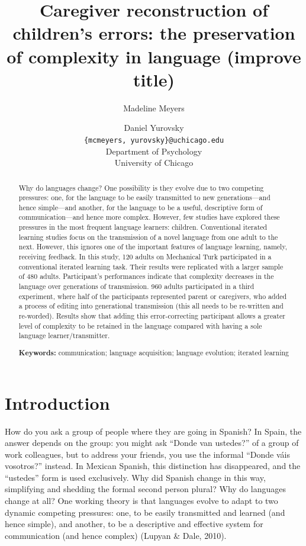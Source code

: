 \documentclass[10pt, letterpaper]{article}
\title{Caregiver reconstruction of children's errors: the preservation of
complexity in language (improve title)}
\author{Madeline Meyers \and Daniel Yurovsky \\
        \texttt{\{mcmeyers, yurovsky\}@uchicago.edu} \\
       Department of Psychology \\ University of Chicago}
\begin{document}
\maketitle

\begin{abstract}
Why do languages change? One possibility is they evolve due to two
competing pressures: one, for the language to be easily transmitted to
new generations---and hence simple---and another, for the language to be
a useful, descriptive form of communication---and hence more complex.
However, few studies have explored these pressures in the most frequent
language learners: children. Conventional iterated learning studies
focus on the transmission of a novel language from one adult to the
next. However, this ignores one of the important features of language
learning, namely, receiving feedback. In this study, 120 adults on
Mechanical Turk participated in a conventional iterated learning task.
Their results were replicated with a larger sample of 480 adults.
Participant's performances indicate that complexity decreases in the
language over generations of transmission. 960 adults participated in a
third experiment, where half of the participants represented parent or
caregivers, who added a process of editing into generational
transmission (this all needs to be re-written and re-worded). Results
show that adding this error-correcting participant allows a greater
level of complexity to be retained in the language compared with having
a sole language learner/transmitter.

\textbf{Keywords:}
communication; language acquisition; language evolution; iterated
learning
\end{abstract}

\section{Introduction}\label{introduction}

How do you ask a group of people where they are going in Spanish? In
Spain, the answer depends on the group: you might ask ``Donde van
ustedes?'' of a group of work colleagues, but to address your friends,
you use the informal ``Donde váis vosotros?'' instead. In Mexican
Spanish, this distinction has disappeared, and the ``ustedes'' form is
used exclusively. Why did Spanish change in this way, simplifying and
shedding the formal second person plural? Why do languages change at
all? One working theory is that languages evolve to adapt to two dynamic
competing pressures: one, to be easily transmitted and learned (and
hence simple), and another, to be a descriptive and effective system for
communication (and hence complex) (Lupyan \& Dale, 2010).
\end{document}
